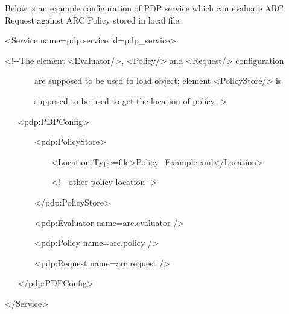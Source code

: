 \documentclass[a4paper]{article}
\begin{document}
{\upshape\color{black}
Below is an example configuration of PDP service which can evaluate ARC
Request against ARC Policy stored in local file.}

{\ttfamily\color{black}
{\textless}Service name={\textquotedbl}pdp.service{\textquotedbl}
id={\textquotedbl}pdp\_service{\textquotedbl}{\textgreater}}

{\ttfamily\color{black}
{\textless}!-{}-The element {\textless}Evaluator/{\textgreater},
{\textless}Policy/{\textgreater} and {\textless}Request/{\textgreater}
configuration}

{\ttfamily\color{black}
\ \ \ \ \ \ \ are supposed to be used to load object; element
{\textless}PolicyStore/{\textgreater} is}

{\ttfamily\color{black}
\ \ \ \ \ \ \ supposed to be used to get the location of
policy-{}-{\textgreater}}

{\ttfamily\color{black}
\ \ \ {\textless}pdp:PDPConfig{\textgreater}}

{\ttfamily\color{black}
\ \ \ \ \ \ \ {\textless}pdp:PolicyStore{\textgreater}}

{\ttfamily\color{black}
\ \ \ \ \ \ \ \ \ \ \ {\textless}Location
Type={\textquotedbl}file{\textquotedbl}{\textgreater}Policy\_Example.xml{\textless}/Location{\textgreater}}

{\ttfamily\color{black}
\ \ \ \ \ \ \ \ \ \ \ {\textless}!-{}- other policy
location-{}-{\textgreater}}

{\ttfamily\color{black}
\ \ \ \ \ \ \ {\textless}/pdp:PolicyStore{\textgreater}}

{\ttfamily\color{black}
\ \ \ \ \ \ \ {\textless}pdp:Evaluator
name={\textquotedbl}arc.evaluator{\textquotedbl} /{\textgreater}}

{\ttfamily\color{black}
\ \ \ \ \ \ \ {\textless}pdp:Policy
name={\textquotedbl}arc.policy{\textquotedbl} /{\textgreater}}

{\ttfamily\color{black}
\ \ \ \ \ \ \ {\textless}pdp:Request
name={\textquotedbl}arc.request{\textquotedbl} /{\textgreater}}

{\ttfamily\color{black}
\ \ \ {\textless}/pdp:PDPConfig{\textgreater}}

{\ttfamily\color{black}
{\textless}/Service{\textgreater}}
\end{document}
